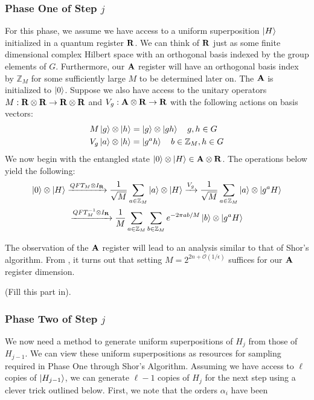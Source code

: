 \subsubsection{Phase One of Step $j$}
For this phase, we assume we have access to a uniform superposition $\ket{H}$ initialized in a quantum register ${\bf R}$. We can think of ${\bf R}$ just as some finite dimensional complex Hilbert space with an orthogonal basis indexed by the group elements of $G$. Furthermore, our ${\bf A}$ register will have an orthogonal basis index by $\mathbb{Z}_M$ for some sufficiently large $M$ to be determined later on. The ${\bf A}$ is initialized to $\ket{0}$.
%
Suppose we also have access to the unitary operators $M: {\bf R} \otimes {\bf R} \rightarrow {\bf R} \otimes {\bf R}$ and $V_g: {\bf A} \otimes
{\bf R} \rightarrow {\bf R}$ with the following actions on basis vectors:
%
\begin{align*}
  & M\ket{g} \otimes \ket{h} = \ket{g} \otimes \ket{gh} \quad g,h \in G \\
  & V_g \ket{a} \otimes \ket{h} = \ket{g^ah} \quad b \in \mathbb{Z}_M, h \in G
\end{align*}
%
We now begin with the entangled state $\ket{0} \otimes \ket{H} \in {\bf A} \otimes {\bf R}$. The operations below yield the following:
%
\begin{gather*}
\ket{0} \otimes \ket{H} \xrightarrow{QFT_{M} \otimes I_{\bf R}} \frac{1}{\sqrt{M}} \sum_{a \in \mathbb{Z}_M} \ket{a} \otimes \ket{H} \xrightarrow{V_g} \frac{1}{\sqrt{M}} \sum_{a \in \mathbb{Z}_M} \ket{a} \otimes \ket{g^aH} \\
\xrightarrow{QFT^{-1}_M \otimes I_{\bf R}} \frac{1}{M}  \sum_{a \in \mathbb{Z}_M} \sum_{b \in \mathbb{Z}_M} e^{-2\pi ab/M}\ket{b} \otimes \ket{g^aH}
\end{gather*}

The observation of the ${\bf A}$ register will lead to an analysis similar to that of Shor's algorithm. From \cite{watrous2001quantum}, it turns out that setting $M = 2^{2n + \mathcal{O}(1/\epsilon)}$ suffices for our ${\bf A}$ register dimension.

(Fill this part in).

\subsubsection{Phase Two of Step $j$}
We now need a method to generate uniform superpositions of $H_j$ from those of $H_{j-1}$. We can view these uniform superpositions as resources for sampling required in Phase One through Shor's Algorithm. Assuming we have access to $\ell$ copies of $\ket{H_{j-1}}$, we can generate $\ell - 1$ copies of $H_{j}$ for the next step using a clever trick outlined below. First, we note that the orders $\alpha_i$ have been

